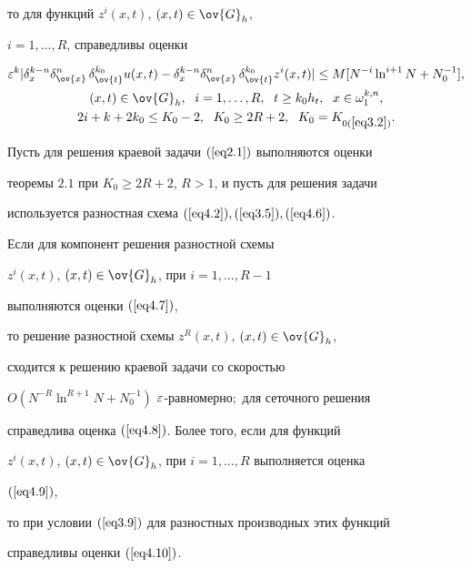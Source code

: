 то для функций $z^i(x,t)$, $(x,t)\in\ov{G}_h$,


$i=1,\dotsc,R$, справедливы оценки


\begin{gather}


\label{eq4.10}


\eps^{k}|\delta_x^{k-n}\delta^n_{\ov{x}}\,\delta_{\ov{t}}^{k_0}u(x,t)-


\delta^{k-n}_x\delta^n_{\ov{x}}\,\delta^{k_0}_{\ov{t}}z^i(x,t)|\le


M[N^{-i}\ln^{i+1}N+N_0^{-1}],\\


(x,t)\in\ov{G}_h,\ \; i=1,\dotsc,R, \ \; t\ge k_0h_t,


\ \; x\in\omega_1^{k,n}, \notag\\


2i+k+2k_0\le K_0-2,\ \; K_0\ge 2R+2,\ \; K_0=K_{0(\ref{eq3.2})}. \notag


\end{gather}





\begin{thms}


Пусть для решения краевой  задачи $(\ref{eq2.1})$ выполняются оценки


теоремы $2.1$ при $K_0\ge 2R+2$, $R> 1$, и пусть для решения задачи


используется разностная схема $(\ref{eq4.2}), (\ref{eq3.5}), (\ref{eq4.6})$.


Если для компонент решения разностной схемы


$z^{i}(x,t)$, $(x,t)\in\ov{G}_h$, при $i=1,\dotsc,R-1$


выполняются оценки $(\ref{eq4.7})$,


то решение разностной схемы $z^R(x,t)$, $(x,t)\in\ov{G}_h$,


сходится к решению краевой задачи со скоростью


$O(N^{-R}\ln^{R+1}N+N_0^{-1})$\; $\varepsilon$-равномерно$;$ для сеточного решения


справедлива оценка $(\ref{eq4.8})$. Более того, если для функций


$z^i(x,t)$, $(x,t)\in \ov{G}_h$, при $i=1,\dotsc,R$ выполняется оценка


$(\ref{eq4.9})$,


то при условии $(\ref{eq3.9})$ для разностных производных этих функций


справедливы оценки $(\ref{eq4.10})$.


\end{thms}





